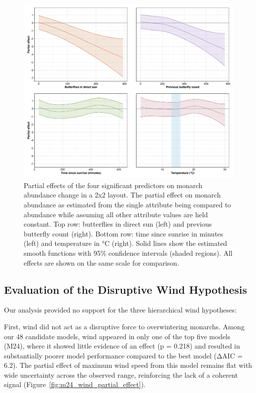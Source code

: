 \begin{figure}[htbp]
\centering
\includegraphics[width=\textwidth]{figures/results/combined_partial_effects_2x2_final.png}
\caption{Partial effects of the four significant predictors on monarch abundance change in a 2x2 layout. The partial effect on monarch abundance as estimated from the single attribute being compared to abundance while assuming all other attribute values are held constant. Top row: butterflies in direct sun (left) and previous butterfly count (right). Bottom row: time since sunrise in minutes (left) and temperature in °C (right). Solid lines show the estimated smooth functions with 95\% confidence intervals (shaded regions). All effects are shown on the same scale for comparison.}\label{fig:partial_effects}
\end{figure}

\subsection{Evaluation of the Disruptive Wind Hypothesis}

Our analysis provided no support for the three hierarchical wind hypotheses:

First, wind did not act as a disruptive force to overwintering monarchs. Among our 48 candidate models, wind appeared in only one of the top five models (M24), where it showed little evidence of an effect (p = 0.218) and resulted in substantially poorer model performance compared to the best model (ΔAIC = 6.2). The partial effect of maximum wind speed from this model remains flat with wide uncertainty across the observed range, reinforcing the lack of a coherent signal (Figure~\ref{fig:m24_wind_partial_effect}).

